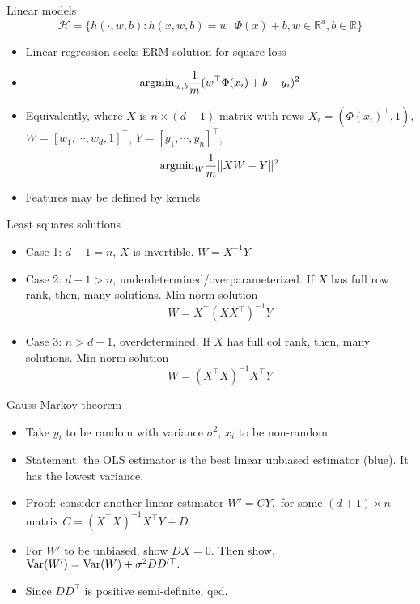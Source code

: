 \documentclass[final]{beamer}
\begin{document}
\begin{frame}{Linear models}
	\begin{equation}
		\mathcal{H} = \{h(\cdot, w, b): h(x, w, b) = w\cdot \Phi(x) + b, w \in \mathbb{R}^d, b \in \mathbb{R} \}
	\end{equation}
\pause
\begin{itemize}
	\item Linear regression seeks ERM solution for square loss
	\pause
	\item $${\rm arg min}_{w, b} \dfrac{1}{m} (w^\top \Phi(x_i) + b - y_i)^2$$
	\pause 
\item Equivalently, where $X$ is $n\times (d+1)$ matrix with rows $X_i = (\Phi(x_i)^\top, 1)$, $W = [w_1, \cdots, w_d, 1]^\top$, $Y = [y_1, \cdots, y_n]^\top$,
	\pause
	$$ {\rm arg min}_{W} \dfrac{1}{m} \|X W - Y\|^2$$
\item Features may be defined by kernels
\end{itemize}
\end{frame}
\begin{frame}{Least squares solutions}
	\begin{itemize}
		\item Case 1: $d+1 = n$, $X$ is invertible. $W = X^{-1} Y$
		\pause 
	\item Case 2: $d+1 > n$, underdetermined/overparameterized. If $X$ has full row rank, then, many solutions. Min norm solution	$$ W = X^\top (X X^\top)^{-1} Y$$
\pause
	\item Case 3: $n > d+1$, overdetermined. If $X$ has full col rank, then, many solutions. Min norm solution $$ W = (X^\top X)^{-1} X^\top Y$$

\end{itemize}
\end{frame}
\begin{frame}{Gauss Markov theorem}
	\begin{itemize}
		\item Take $y_i$ to be random with variance $\sigma^2$, $x_i$ to be non-random.
		\pause
		\item Statement: the OLS estimator is the best linear unbiased estimator (blue). It has the lowest variance.
		\pause
	\item Proof: consider another linear estimator $W' = C Y,$ for some $(d+1)\times n$ matrix $C =  (X^\top X)^{-1} X^\top Y + D$. 
	\pause 
	\item For $W'$ to be unbiased, show $DX = 0$. Then show, ${\rm Var}(W') = {\rm Var}(W) + \sigma^2 DD'^\top.$
	\pause
	\item Since $DD^\top$ is positive semi-definite, qed.
	\end{itemize}
\end{frame}
\end{document}
